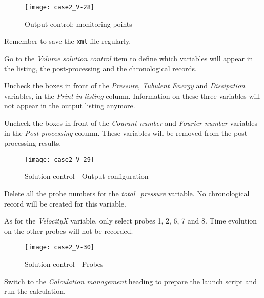 \begin{figure}[h!]
\begin{center}
\texttt{[image: case2\_V-28]}
\caption{Output control: monitoring points}
\label{fig28_e2}
\end{center}
\end{figure}

Remember to save the \texttt{xml} file regularly.


\newpage
Go to the {\itshape Volume solution control} item to define which variables will
appear in the listing, the post-processing and the chronological records.

Uncheck the boxes in front of the {\itshape Pressure}, {\itshape Tubulent Energy}
and {\itshape Dissipation} variables, in the {\itshape  Print in listing} column.
Information on these three variables will not appear in the output listing anymore.

Uncheck the boxes in front of the {\itshape Courant number} and {\itshape Fourier number}
variables in the {\itshape Post-processing} column. These variables will be removed from
the post-processing results.

\begin{figure}[h!]
\begin{center}
\texttt{[image: case2\_V-29]}
\caption{Solution control - Output configuration}
\label{fig29_e2}
\end{center}
\end{figure}


\newpage
Delete all the probe numbers for the {\itshape total\_pressure} variable.
No chronological record will be created for this variable.

As for the {\itshape VelocityX} variable, only select probes  1, 2, 6, 7 and 8.
Time evolution on the other probes will not be recorded.

\begin{figure}[h!]
\begin{center}
\texttt{[image: case2\_V-30]}
\caption{Solution control - Probes}
\label{fig30_e2}
\end{center}
\end{figure}

Switch to the {\itshape Calculation management} heading to prepare the launch
script and run the calculation.

